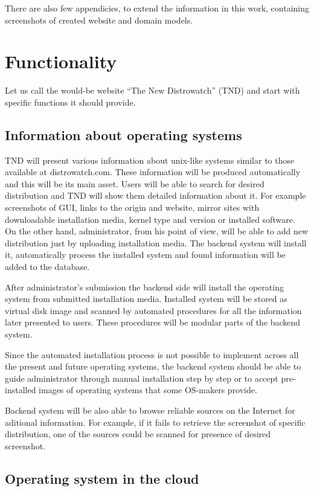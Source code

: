 \documentclass[thesis=B,english]{FITthesis}[2013/04/26]
\begin{document}
There are also few appendicies, to extend the information in this work, containing screenshots of created website and domain models.

\section{Functionality}

Let us call the would-be website ``The New Distrowatch'' (TND) and start with specific functions it should provide.

\subsection{Information about operating systems}

TND will present various information about unix-like systems similar to those available at distrowatch.com. These information will be produced automatically and this will be its main asset. Users will be able to search for desired distribution and TND will show them detailed information about it. For example screenshots of GUI, links to the origin and website, mirror sites with downloadable installation media, kernel type and version or installed software. On the other hand, administrator, from his point of view, will be able to add new distribution just by uploading installation media. The backend system will install it, automatically process the installed system and found information will be added to the database.

After administrator's submission the backend side will install the operating system from submitted installation media. Installed system will be stored as virtual disk image and scanned by automated procedures for all the information later presented to users. These procedures will be modular parts of the backend system.

Since the automated installation process is not possible to implement across all the present and future operating systems, the backend system should be able to guide administrator through manual installation step by step or to accept pre-installed images of operating systems that some OS-makers provide.

Backend system will be also able to browse reliable sources on the Internet for aditional information. For example, if it fails to retrieve the screenshot of specific distribution, one of the sources could be scanned for presence of desired screenshot.

\subsection{Operating system in the cloud}
\end{document}
